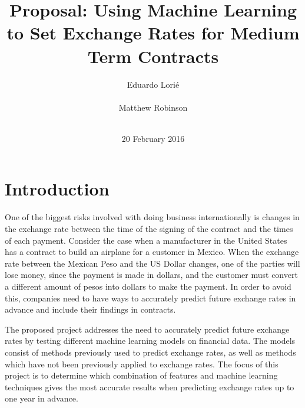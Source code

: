 \documentclass{sig-alternate-05-2015}
\begin{document}


\title{{Proposal: Using Machine Learning to Set Exchange Rates for Medium Term Contracts}
}
\author{
\alignauthor
Eduardo Lori\'e\\
       \\
\alignauthor 
Matthew Robinson \\
       \\
}

\date{20 February 2016}

\maketitle

\section{Introduction}
One of the biggest risks involved with doing business internationally is changes in the exchange rate between the time of the signing of the contract and the times of each payment. Consider the case when a manufacturer in the United States has a contract to build an airplane for a customer in Mexico. When the exchange rate between the Mexican Peso and the US Dollar changes, one of the parties will lose money, since the payment is made in dollars, and the customer must convert a different amount of pesos into dollars to make the payment. In order to avoid this, companies need to have ways to accurately predict future exchange rates in advance and include their findings in contracts.
\par{} The proposed project addresses the need to accurately predict future exchange rates by testing different machine learning models on financial data. The models consist of methods previously used to predict exchange rates, as well as methods which have not been previously applied to exchange rates. The focus of this project is to determine which combination of features and machine learning techniques gives the most accurate results when predicting exchange rates up to one year in advance.    
\end{document}
